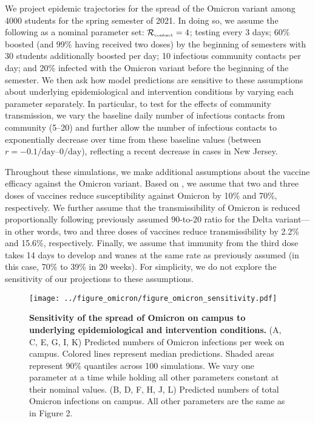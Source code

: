 \documentclass[12pt]{article}
\newcommand{\Rx}[1]{\ensuremath{{\mathcal R}_{#1}}}
\newcommand{\Rc}{\Rx{\textrm{\tiny{contact}}}}
\begin{document}
We project epidemic trajectories for the spread of the Omicron variant among 4000 students for the spring semester of 2021.
In doing so, we assume the following as a nominal parameter set: $\Rc = 4$; testing every 3 days; 60\% boosted (and 99\% having received two doses) by the beginning of semesters with 30 students additionally boosted per day; 10 infectious community contacts per day; and 20\% infected with the Omicron variant before the beginning of the semester.
We then ask how model predictions are sensitive to these assumptions about underlying epidemiological and intervention conditions by varying each parameter separately.
In particular, to test for the effects of community transmission, we vary the baseline daily number of infectious contacts from community (5--20) and further allow the number of infectious contacts to exponentially decrease over time from these baseline values (between $r=-0.1/\textrm{day}$--$0/\textrm{day}$), reflecting a recent decrease in cases in New Jersey.

Throughout these simulations, we make additional assumptions about the vaccine efficacy against the Omicron variant.
Based on \cite{ferguson2021report}, we assume that two and three doses of vaccines reduce susceptibility against Omicron by 10\% and 70\%, respectively.
We further assume that the transmissibility of Omicron is reduced proportionally following previously assumed 90-to-20 ratio for the Delta variant---in other words, two and three doses of vaccines reduce transmissibility by 2.2\% and 15.6\%, respectively.
Finally, we assume that immunity from the third dose takes 14 days to develop and wanes at the same rate as previously assumed (in this case, 70\% to 39\% in 20 weeks).
For simplicity, we do not explore the sensitivity of our projections to these assumptions.

\begin{figure}[!ht]
\texttt{[image: ../figure\_omicron/figure\_omicron\_sensitivity.pdf]}
\caption{
\textbf{Sensitivity of the spread of Omicron on campus to underlying epidemiological and intervention conditions.}
(A, C, E, G, I, K) Predicted numbers of Omicron infections per week on campus. 
Colored lines represent median predictions.
Shaded areas represent 90\% quantiles across 100 simulations.
We vary one parameter at a time while holding all other parameters constant at their nominal values.
(B, D, F, H, J, L) Predicted numbers of total Omicron infections on campus.
All other parameters are the same as in Figure 2.
\label{fig:sensitivity}
}
\end{figure}
\end{document}
